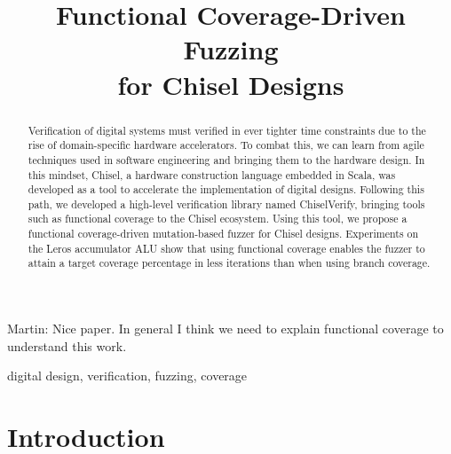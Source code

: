 \documentclass[conference]{IEEEtran}
\newcommand{\martin}[1]{{\color{blue} Martin: #1}}
\begin{document}

\title{Functional Coverage-Driven Fuzzing\\ for Chisel Designs}

\author{


}


\maketitle \thispagestyle{empty}

\begin{abstract}

Verification of digital systems must verified in ever tighter time constraints due to the rise of domain-specific hardware accelerators.
To combat this, we can learn from agile techniques used in software engineering and bringing them to the hardware design.
In this mindset, Chisel, a hardware construction language embedded in Scala, was developed as a tool to accelerate the implementation of digital designs.
Following this path, we developed a high-level verification library named ChiselVerify, bringing tools such as functional coverage to the Chisel ecosystem.
Using this tool, we propose a functional coverage-driven mutation-based fuzzer for Chisel designs.
Experiments on the Leros accumulator ALU show that using functional coverage enables the fuzzer to attain a target coverage percentage in less iterations than when using branch coverage.

\end{abstract}

\martin{Nice paper. In general I think we need to explain functional coverage to understand this work.}

\begin{IEEEkeywords}
digital design, verification, fuzzing, coverage
\end{IEEEkeywords}
\section{Introduction}
\label{sec:intro}
\end{document}
